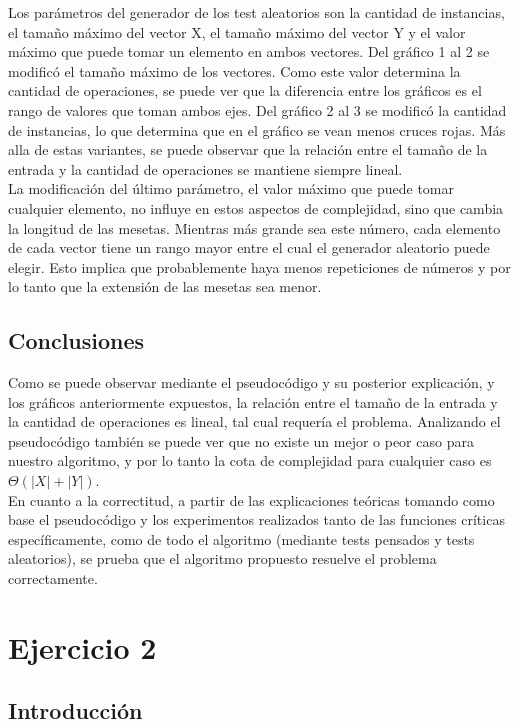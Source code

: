 \documentclass[10pt, a4paper,english,spanish]{article}
\begin{document}
Los parámetros del generador de los test aleatorios son la cantidad de instancias, el tamaño máximo
del vector X, el tamaño máximo del vector Y y el valor máximo que puede tomar un elemento
en ambos vectores. Del gráfico 1 al 2 se modificó el tamaño máximo de los vectores. Como este valor
determina la cantidad de operaciones, se puede ver que la diferencia entre los gráficos es el rango
de valores que toman ambos ejes. Del gráfico 2 al 3 se modificó la cantidad de instancias, lo que
determina que en el gráfico se vean menos cruces rojas. Más alla de estas variantes, se puede observar
que la relación entre el tamaño de la entrada y la cantidad de operaciones se mantiene siempre lineal. \\
\indent La modificación del último parámetro, el valor máximo que puede tomar cualquier elemento, no influye
en estos aspectos de complejidad, sino que cambia la longitud de las mesetas. Mientras más grande sea
este número, cada elemento de cada vector tiene un rango mayor entre el cual el generador aleatorio
puede elegir. Esto implica que probablemente haya menos repeticiones de números y por lo tanto
que la extensión de las mesetas sea menor.

\subsection{Conclusiones}
Como se puede observar mediante el pseudocódigo y su posterior explicación, y los gráficos anteriormente
expuestos, la relación entre el tamaño de la entrada y la cantidad de operaciones es lineal, tal cual
requería el problema. Analizando el pseudocódigo también se puede ver que no existe un mejor o peor caso
para nuestro algoritmo, y por lo tanto la cota de complejidad para cualquier caso es $\Theta(|X| + |Y|)$. \\
\indent En cuanto a la correctitud, a partir de las explicaciones teóricas tomando como base
el pseudocódigo y los experimentos realizados tanto de las funciones críticas específicamente,
como de todo el algoritmo (mediante tests pensados y tests aleatorios), se prueba que el algoritmo
propuesto resuelve el problema correctamente.

\newpage

\section{Ejercicio 2}

\subsection{Introducción}
\end{document}
